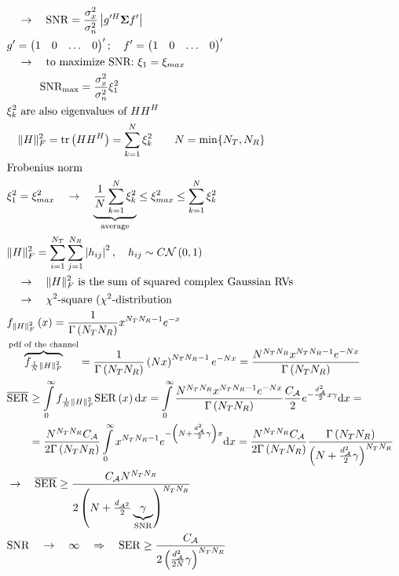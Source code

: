 \begin{align*}
	& \quad\rightarrow\quad\mathrm{SNR}=\frac{\sigma_x^2}{\sigma_n^2}\left|g'^H\mathbf{\Sigma}f'\right| \\
	& g'=\begin{pmatrix}1&0&\ldots&0\end{pmatrix}';\quad f'=\begin{pmatrix}1&0&\ldots&0\end{pmatrix}' \\
	& \quad\rightarrow\quad\text{to maximize SNR: }\xi_1=\xi_{max} \\
	& \quad\quad\quad\mathrm{SNR_{max}}=\frac{\sigma_x^2}{\sigma_n^2}\xi_1^2 \\
	& \text{$\xi_k^2$ are also eigenvalues of $HH^H$} \\
	& \quad\|H\|_F^2=\operatorname{tr}\left(HH^H\right)=\sum\limits_{k=1}^N\xi_k^2\qquad N=\min\{N_T,N_R\} \\
	& \text{Frobenius norm} \\
	& \xi_1^2=\xi_{max}^2\quad\rightarrow\quad\underbrace{\frac{1}{N}\sum\limits_{k=1}^N\xi_k^2}_{\text{average}}\le\xi_{max}^2\le\sum\limits_{k=1}^N\xi_k^2 \\
	& \|H\|_F^2=\sum\limits_{i=1}^{N_T}\sum\limits_{j=1}^{N_R}\left|h_{ij}\right|^2,\quad h_{ij}\sim C\mathcal{N}\left(0,1\right) \\
	& \quad\rightarrow\quad\|H\|_F^2\text{ is the sum of squared complex Gaussian RVs} \\
	& \quad\rightarrow\quad\text{$\chi^2$-square ($\chi^2$-distribution} \\
	& f_{{\|H\|}_F^2}\left(x\right)=\frac{1}{\Gamma\left(N_TN_R\right)}x^{N_TN_R-1}e^{-x} \\
	& \overbrace{f_{\frac{1}{N}{\|H\|}_F^2}}^{\text{pdf of the channel}}=\frac{1}{\Gamma\left(N_TN_R\right)}\left(Nx\right)^{N_TN_R-1}e^{-Nx} = \frac{N^{N_TN_R}x^{N_TN_R-1}e^{-Nx}}{\Gamma\left(N_TN_R\right)} \\
	& \overline{\mathrm{SER}}\ge\int\limits_0^\infty f_{\frac{1}{N}{\|H\|}_F^2}\mathrm{SER}\left(x\right)\mathrm{d}x = \int\limits_0^\infty\frac{N^{N_TN_R}x^{N_TN_R-1}e^{-Nx}}{\Gamma\left(N_TN_R\right)}\frac{C_\mathcal{A}}{2}e^{-\frac{d_\mathcal{A}^2}{2}x\gamma}\mathrm{d}x= \\
	& \qquad=\frac{N^{N_TN_R}C_\mathcal{A}}{2\Gamma\left(N_TN_R\right)}\int\limits_0^\infty x^{N_TN_R-1}e^{-\left(N+\frac{d_\mathcal{A}^2}{2}\gamma\right)x}\mathrm{d}x=\frac{N^{N_TN_R}C_\mathcal{A}}{2\Gamma\left(N_TN_R\right)}\frac{\Gamma\left(N_TN_R\right)}{\left(N+\frac{d_\mathcal{A}^2}{2}\gamma\right)^{N_TN_R}} \\
	& \rightarrow\quad\overline{\mathrm{SER}}\ge\frac{C_\mathcal{A}N^{N_TN_R}}{2\left(N+\frac{d_{\mathcal{A}^2}}{2}\underbrace{\gamma}_{\mathrm{SNR}}\right)^{N_TN_R}} \\
	& \mathrm{SNR}\quad\rightarrow\quad\infty\quad\Rightarrow\quad\mathrm{SER}\ge\frac{C_\mathcal{A}}{2\left(\frac{d_\mathcal{A}^2}{2N}\gamma\right)^{N_TN_R}}
\end{align*}
